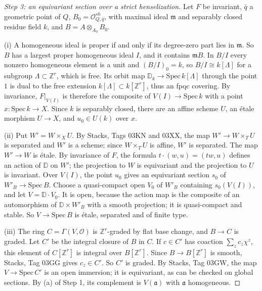 \begin{proof}[Step 3: an equivariant section over a strict henselization]
Let $F$ be invariant, $\bar{q}$ a geometric point of $Q$, $B_0=\mathcal{O}^{sh}_{Q,\bar{q}}$, with maximal ideal $\mathfrak{m}$ and separably closed residue field $k$, and $B=A\otimes_{A_0}B_0$.

(i) A homogeneous ideal is proper if and only if its degree-zero part lies in $\mathfrak{m}$. So $B$ has a largest proper homogeneous ideal $I$, and it contains $\mathfrak{m}B$. In $B/I$ every nonzero homogeneous element is a unit and $(B/I)_0=k$, so $B/I\cong k[\Lambda]$ for a subgroup $\Lambda\subset\mathbb{Z}^r$, which is free. Its orbit map $\mathbb{D}_k\to\mathrm{Spec}\,k[\Lambda]$ through the point $1$ is dual to the free extension $k[\Lambda]\subset k[\mathbb{Z}^r]$, thus an fpqc covering. By invariance, $F|_{V(I)}$ is therefore the composite of $V(I)\to\mathrm{Spec}\,k$ with a point $x\colon\mathrm{Spec}\,k\to X$. Since $k$ is separably closed, there are an affine scheme $U$, an étale morphism $U\to X$, and $u_0\in U(k)$ over $x$.

(ii) Put $W'=W\times_X U$. By Stacks, Tags 03KN and 03XX, the map $W'\to W\times_T U$ is separated and $W'$ is a scheme; since $W\times_T U$ is affine, $W'$ is separated. The map $W'\to W$ is étale. By invariance of $F$, the formula $t\cdot(w,u)=(tw,u)$ defines an action of $\mathbb{D}$ on $W'$; the projection to $W$ is equivariant and the projection to $U$ is invariant. Over $V(I)$, the point $u_0$ gives an equivariant section $s_0$ of $W'_B\to\mathrm{Spec}\,B$. Choose a quasi-compact open $V_0$ of $W'_B$ containing $s_0(V(I))$, and let $V=\mathbb{D}\cdot V_0$. It is open, because the action map is the composite of an automorphism of $\mathbb{D}\times W'_B$ with a smooth projection; it is quasi-compact and stable. So $V\to\mathrm{Spec}\,B$ is étale, separated and of finite type.

(iii) The ring $C=\Gamma(V,\mathcal{O})$ is $\mathbb{Z}^r$-graded by flat base change, and $B\to C$ is graded. Let $C'$ be the integral closure of $B$ in $C$. If $c\in C'$ has coaction $\sum_z c_z\chi^z$, this element of $C[\mathbb{Z}^r]$ is integral over $B[\mathbb{Z}^r]$. Since $B\to B[\mathbb{Z}^r]$ is smooth, Stacks, Tag 03GG gives $c_z\in C'$. So $C'$ is graded. By Stacks, Tag 03GW, the map $V\to\mathrm{Spec}\,C'$ is an open immersion; it is equivariant, as can be checked on global sections. By (a) of Step 1, its complement is $V(\mathfrak{a})$ with $\mathfrak{a}$ homogeneous.


\end{proof}
